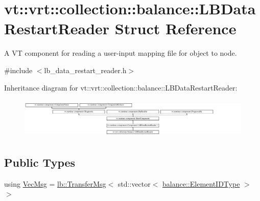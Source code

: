 \hypertarget{structvt_1_1vrt_1_1collection_1_1balance_1_1_l_b_data_restart_reader}{}\section{vt\+:\+:vrt\+:\+:collection\+:\+:balance\+:\+:L\+B\+Data\+Restart\+Reader Struct Reference}
\label{structvt_1_1vrt_1_1collection_1_1balance_1_1_l_b_data_restart_reader}


A VT component for reading a user-\/input mapping file for object to node.  




{\ttfamily \#include $<$lb\+\_\+data\+\_\+restart\+\_\+reader.\+h$>$}

Inheritance diagram for vt\+:\+:vrt\+:\+:collection\+:\+:balance\+:\+:L\+B\+Data\+Restart\+Reader\+:\begin{figure}[H]
\begin{center}
\leavevmode
\includegraphics[height=1.955307cm]{structvt_1_1vrt_1_1collection_1_1balance_1_1_l_b_data_restart_reader}
\end{center}
\end{figure}
\subsection*{Public Types}
\begin{DoxyCompactItemize}
\item 
using \hyperlink{structvt_1_1vrt_1_1collection_1_1balance_1_1_l_b_data_restart_reader_ad48bf75b314df0ec9dbcf5c274fef246}{Vec\+Msg} = \hyperlink{structvt_1_1vrt_1_1collection_1_1lb_1_1_transfer_msg}{lb\+::\+Transfer\+Msg}$<$ std\+::vector$<$ \hyperlink{namespacevt_1_1vrt_1_1collection_1_1balance_a592736f733df4f90856df90a1fd08905}{balance\+::\+Element\+I\+D\+Type} $>$ $>$
\end{DoxyCompactItemize}
